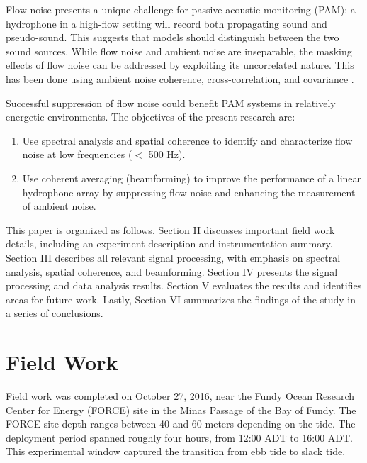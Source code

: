 \documentclass[12pt,journal,onecolumn]{IEEEtran}
\begin{document}
Flow noise presents a unique challenge for passive acoustic monitoring (PAM): a hydrophone in a high-flow setting will record both propagating sound and pseudo-sound. This suggests that models should distinguish between the two sound sources. While flow noise and ambient noise are inseparable, the masking effects of flow noise can be addressed by exploiting its uncorrelated nature. This has been done using ambient noise coherence, cross-correlation, and covariance \cite{barclaywind} \cite{chung} \cite{buck2}.  %

Successful suppression of flow noise could benefit PAM systems in relatively energetic environments.
The objectives of the present research are: 
\begin{enumerate}
\item Use spectral analysis and spatial coherence to identify and characterize flow noise at low frequencies ($<$ 500 Hz).
\item Use coherent averaging (beamforming) to improve the performance of a linear hydrophone array by suppressing flow noise and enhancing the measurement of ambient noise. 
\end{enumerate}

This paper is organized as follows. Section II discusses important field work details, including an experiment description and instrumentation summary. Section III describes all relevant signal processing, with emphasis on spectral analysis, spatial coherence, and beamforming. Section IV presents the signal processing and data analysis results. Section V evaluates the results and identifies areas for future work. Lastly, Section VI summarizes the findings of the study in a series of conclusions.





\section{Field Work}
\label{II}

Field work was completed on October 27, 2016, near the Fundy Ocean Research Center for Energy (FORCE) site in the Minas Passage of the Bay of Fundy. The FORCE site depth ranges between 40 and 60 meters depending on the tide. The deployment period spanned roughly four hours, from 12:00 ADT to 16:00 ADT. This experimental window captured the transition from ebb tide to slack tide. 
\end{document}
